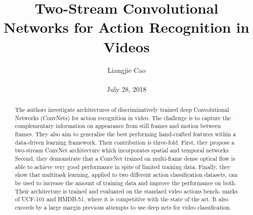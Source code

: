 \documentclass[10pt,twocolumn,letterpaper]{article}
\begin{document}
\title{\textbf{Two-Stream Convolutional Networks
		for Action Recognition in Videos}}
\author{Liangjie Cao\\\\ July 28, 2018}
\maketitle
\begin{abstract}
The authors investigate architectures of discriminatively trained deep Convolutional Networks (ConvNets) for action recognition in video. The challenge is to capture the complementary information on appearance from still frames and motion between frames. They also aim to generalise the best performing hand-crafted features within a data-driven learning framework. Their contribution is three-fold. First, they propose a two-stream ConvNet architecture which incorporates spatial and temporal networks. Second, they demonstrate that a ConvNet trained on multi-frame dense optical flow is able to achieve very good performance in spite of limited training data. Finally, they show that multitask learning, applied to two different action classification datasets, can be used to increase the amount of training data and improve the performance on both. Their architecture is trained and evaluated on the standard video actions bench-
marks of UCF-101 and HMDB-51, where it is competitive with the state of the
art. It also exceeds by a large margin previous attempts to use deep nets for video classification.
\end{abstract}
\end{document}
